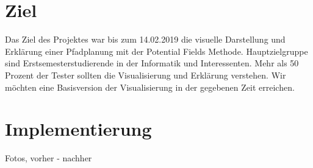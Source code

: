 


 \section{Ziel}
Das Ziel des Projektes war bis zum 14.02.2019 die visuelle Darstellung und Erklärung einer Pfadplanung mit der Potential Fields Methode. Hauptzielgruppe sind Erstsemesterstudierende in der Informatik und Interessenten. Mehr als 50 Prozent der Tester sollten die Visualisierung und Erklärung verstehen. Wir möchten eine Basisversion der Visualisierung in der gegebenen Zeit erreichen.

\section{Implementierung}
Fotos, vorher - nachher

